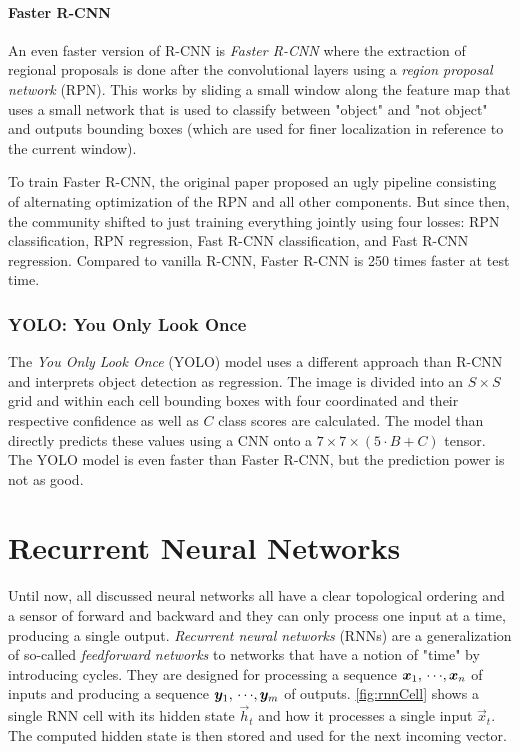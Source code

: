 			\subsubsection{Faster R-CNN}
				An even faster version of R-CNN is \emph{Faster R-CNN} where the extraction of regional proposals is done after the convolutional layers using a \emph{region proposal network} (RPN). This works by sliding a small window along the feature map that uses a small network that is used to classify between "object" and "not object" and outputs bounding boxes (which are used for finer localization in reference to the current window).

				To train Faster R-CNN, the original paper proposed an ugly pipeline consisting of alternating optimization of the RPN and all other components. But since then, the community shifted to just training everything jointly using four losses: RPN classification, RPN regression, Fast R-CNN classification, and Fast R-CNN regression. Compared to vanilla R-CNN, Faster R-CNN is \num{250} times faster at test time.

		\subsection{YOLO: You Only Look Once}
			The \emph{You Only Look Once} (YOLO) model uses a different approach than R-CNN and interprets object detection as regression. The image is divided into an \(S \times S\) grid and within each cell bounding boxes with four coordinated and their respective confidence as well as \(C\) class scores are calculated. The model than directly predicts these values using a CNN onto a \( 7 \times 7 \times (5 \cdot B + C) \) tensor. The YOLO model is even faster than Faster R-CNN, but the prediction power is not as good.

\chapter{Recurrent Neural Networks}
	Until now, all discussed neural networks all have a clear topological ordering and a sensor of forward and backward and they can only process one input at a time, producing a single output. \emph{Recurrent neural networks} (RNNs) are a generalization of so-called \emph{feedforward networks} to networks that have a notion of "time" by introducing cycles. They are designed for processing a sequence \( \bm{x}_1,\,\cdots\!,\bm{x}_n \) of inputs and producing a sequence \( \bm{y}_1,\,\cdots\!,\bm{y}_m \) of outputs. \autoref{fig:rnnCell} shows a single RNN cell with its hidden state \(\vec{h}_t\) and how it processes a single input \(\vec{x}_t\). The computed hidden state is then stored and used for the next incoming vector.

